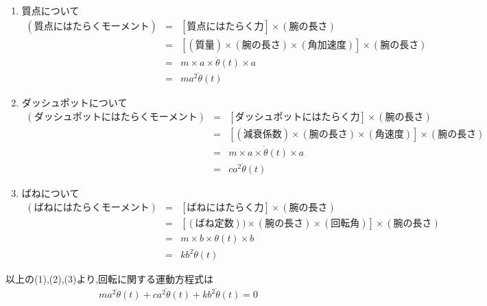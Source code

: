 \documentclass[a4paper]{jsarticle}
\begin{document}
\begin{enumerate}[(1)]
    \item 質点について\\
          \begin{eqnarray*}
              (質点にはたらくモーメント)&=& [質点にはたらく力] \times (腕の長さ)\\
              &=& [(質量) \times (腕の長さ) \times (角加速度)] \times (腕の長さ)\\
              &=& m \times a \times \ddot{\theta}\left(t\right) \times a\\
              &=&ma^2\ddot{\theta}\left(t\right)
          \end{eqnarray*}
    \item ダッシュポットについて
          \begin{eqnarray*}
              (ダッシュポットにはたらくモーメント)&=& [ダッシュポットにはたらく力] \times (腕の長さ)\\
              &=& [(減衰係数) \times (腕の長さ) \times (角速度)] \times (腕の長さ)\\
              &=& m \times a \times \dot{\theta}\left(t\right) \times a\\
              &=&ca^2\dot{\theta}\left(t\right)
          \end{eqnarray*}
    \item ばねについて
          \begin{eqnarray*}
              (ばねにはたらくモーメント)&=& [ばねにはたらく力] \times (腕の長さ)\\
              &=& [(ばね定数)) \times (腕の長さ) \times (回転角)] \times (腕の長さ)\\
              &=& m \times b \times \theta\left(t\right) \times b\\
              &=&kb^2\dot{\theta}\left(t\right)
          \end{eqnarray*}
\end{enumerate}
以上の(1),(2),(3)より,回転に関する運動方程式は
\begin{eqnarray*}
    ma^2\ddot{\theta}\left(t\right)+ca^2\dot{\theta}\left(t\right)+kb^2\dot{\theta}\left(t\right)=0\\
\end{eqnarray*}
\end{document}
